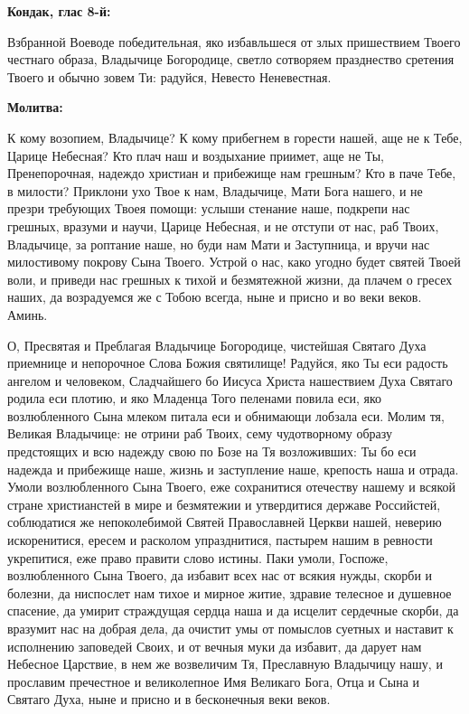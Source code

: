 \medskip


\bfseries Кондак, глас 8-й:\normalfont{}\nopagebreak


Взбранной Воеводе победительная, яко избавльшеся от злых пришествием Твоего честнаго образа, Владычице Богородице, светло сотворяем празднество сретения Твоего и обычно зовем Ти: радуйся, Невесто Неневестная.


\medskip


\bfseries Молитва:\normalfont{}\nopagebreak


К кому возопием, Владычице? К кому прибегнем в горести нашей, аще не к Тебе, Царице Небесная? Кто плач наш и воздыхание приимет, аще не Ты, Пренепорочная, надеждо христиан и прибежище нам грешным? Кто в паче Тебе, в милости? Приклони ухо Твое к нам, Владычице, Мати Бога нашего, и не презри требующих Твоея помощи: услыши стенание наше, подкрепи нас грешных, вразуми и научи, Царице Небесная, и не отступи от нас, раб Твоих, Владычице, за роптание наше, но буди нам Мати и Заступница, и вручи нас милостивому покрову Сына Твоего. Устрой о нас, како угодно будет святей Твоей воли, и приведи нас грешных к тихой и безмятежной жизни, да плачем о гресех наших, да возрадуемся же с Тобою всегда, ныне и присно и во веки веков. Аминь.
\nopagebreak\bigskip\bigskip\mychapterending

 


О, Пресвятая и Преблагая Владычице Богородице, чистейшая Святаго Духа приемнице и непорочное Слова Божия святилище! Радуйся, яко Ты еси радость ангелом и человеком, Сладчайшего бо Иисуса Христа нашествием Духа Святаго родила еси плотию, и яко Младенца Того пеленами повила еси, яко возлюбленного Сына млеком питала еси и обнимающи лобзала еси. Молим тя, Великая Владычице: не отрини раб Твоих, сему чудотворному образу предстоящих и всю надежду свою по Бозе на Тя возложивших: Ты бо еси надежда и прибежище наше, жизнь и заступление наше, крепость наша и отрада. Умоли возлюбленного Сына Твоего, еже сохранитися отечеству нашему и всякой стране христианстей в мире и безмятежии и утвердитися державе Российстей, соблюдатися же непоколебимой Святей Православней Церкви нашей, неверию искоренитися, ересем и расколом упразднитися, пастырем нашим в ревности укрепитися, еже право правити слово истины. Паки умоли, Госпоже, возлюбленного Сына Твоего, да избавит всех нас от всякия нужды, скорби и болезни, да ниспослет нам тихое и мирное житие, здравие телесное и душевное спасение, да умирит страждущая сердца наша и да исцелит сердечные скорби, да вразумит нас на добрая дела, да очистит умы от помыслов суетных и наставит к исполнению заповедей Своих, и от вечныя муки да избавит, да дарует нам Небесное Царствие, в нем же возвеличим Тя, Преславную Владычицу нашу, и прославим пречестное и великолепное Имя Великаго Бога, Отца и Сына и Святаго Духа, ныне и присно и в бесконечныя веки веков.
\nopagebreak\bigskip\bigskip\mychapterending

